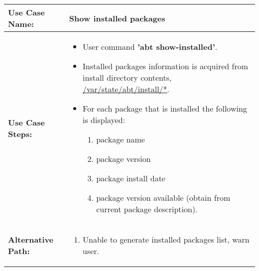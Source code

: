 \medskip

\begin{tabularx}{\linewidth}{|l|X|}
\hline
\textbf{Use Case Name:} & \textbf{Show installed packages} \\
\hline
\textbf{Use Case Steps:} & 
\begin{minipage}{\linewidth} 
  \vspace{0.05em}
  \begin{itemize}
    \item User command \textbf{'abt show-installed'}.
    \item Installed packages information is acquired from install directory contents, \url{/var/state/abt/install/*}.
    \item For each package that is installed the following is displayed:
    \begin{enumerate}
      \item package name
      \item package version
      \item package install date
      \item package version available (obtain from current package description).
    \end{enumerate}
  \end{itemize}
  \vspace{0.05em}
\end{minipage}
\\
\hline 
\textbf{Alternative Path:} &
\begin{minipage}{\linewidth}
  \vspace{0.05em} 
  \begin{enumerate}
    \item Unable to generate installed packages list, warn user.
  \end{enumerate}
  \vspace{0.05em} 
\end{minipage}
\\
\hline
\end{tabularx}